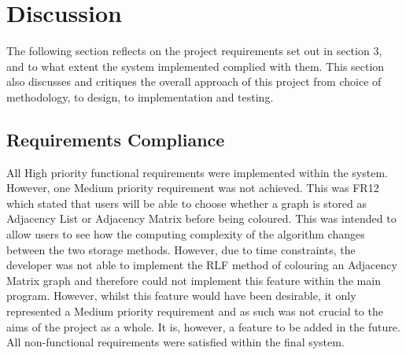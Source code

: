 \section{Discussion}
The following section reflects on the project requirements set out in section 3, and to what extent the system implemented complied with them. This section also discusses and critiques the overall approach of this project from choice of methodology, to design, to implementation and testing.

\subsection{Requirements Compliance}
All High priority functional requirements were implemented within the system. However, one Medium priority requirement was not achieved. This was FR12 which stated that users will be able to choose whether a graph is stored as Adjacency List or Adjacency Matrix before being coloured. This was intended to allow users to see how the computing complexity of the algorithm changes between the two storage methods. However, due to time constraints, the developer was not able to implement the RLF method of colouring an Adjacency Matrix graph and therefore could not implement this feature within the main program. However, whilst this feature would have been desirable, it only represented a Medium priority requirement and as such was not crucial to the aims of the project as a whole. It is, however, a feature to be added in the future. All non-functional requirements were satisfied within the final system. 

